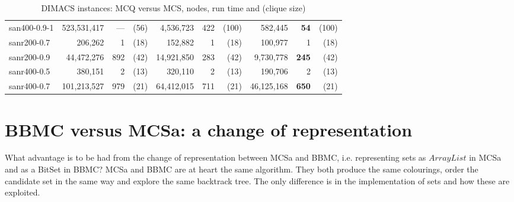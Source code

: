 \documentclass{l4proj}
\begin{document}
\begin{table}
\begin{center}
\begin{scriptsize}
\begin{tabular}{|l|r r r|r r r|r r r|}
san400-0.9-1 & 523,531,417 & --- & (56) & 4,536,723 & 422 & (100) & 582,445 & \bf{54} & (100) \\ 
sanr200-0.7 & 206,262 & 1 & (18) & 152,882 & 1 & (18) & 100,977 & 1 & (18) \\ 
sanr200-0.9 & 44,472,276 & 892 & (42) & 14,921,850 & 283 & (42) & 9,730,778 & \bf{245} & (42) \\ 
sanr400-0.5 & 380,151 & 2 & (13) & 320,110 & 2 & (13) & 190,706 & 2 & (13) \\ 
sanr400-0.7 & 101,213,527 & 979 & (21) & 64,412,015 & 711 & (21) & 46,125,168 & \bf{650} & (21) \\ \hline
\end{tabular}
\end{scriptsize}
\end{center}
\caption{DIMACS instances: MCQ versus MCS, nodes, run time and (clique size)}
\label{tableMCQvMCS}
\end{table}


\section{BBMC versus MCSa: a change of representation}
What advantage is to be had from the change of representation between MCSa and BBMC, i.e. representing
sets as $ArrayList$ in MCSa and as a BitSet in BBMC? MCSa and BBMC are at heart the same algorithm. They both
produce the same colourings, order the candidate set in the same way and explore the same backtrack tree. The only difference
is in the implementation of sets and how these are exploited.
\end{document}

